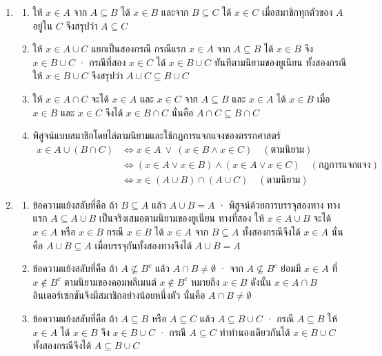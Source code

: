 \begin{enumerate}[resume*=anskey]
    \item
    \begin{enumerate}[label=\textbf{\thechapter.\arabic{enumi}.\arabic*}]
        \item ให้ $x \in A$ จาก $A \subseteq B$ ได้ $x \in B$ และจาก $B \subseteq C$ ได้ $x \in C$ เมื่อสมาชิกทุกตัวของ $A$ อยู่ใน $C$ จึงสรุปว่า $A \subseteq C$
        \item ให้ $x \in A \cup C$ แยกเป็นสองกรณี กรณีแรก $x \in A$ จาก $A \subseteq B$ ได้ $x \in B$ จึง $x \in B \cup C$ · กรณีที่สอง $x \in C$ ได้ $x \in B \cup C$ ทันทีตามนิยามของยูเนียน ทั้งสองกรณีให้ $x \in B \cup C$ จึงสรุปว่า $A \cup C \subseteq B \cup C$
        \item ให้ $x \in A \cap C$ จะได้ $x \in A$ และ $x \in C$ จาก $A \subseteq B$ และ $x \in A$ ได้ $x \in B$ เมื่อ $x \in B$ และ $x \in C$ จึงได้ $x \in B \cap C$ นั่นคือ $A \cap C \subseteq B \cap C$
        \item พิสูจน์แบบสมาชิกโดยไล่ตามนิยามและใช้กฎการแจกแจงของตรรกศาสตร์
        \begin{align*}
        x \in A \cup (B \cap C)
        &\Leftrightarrow x \in A \ \lor\ (x \in B \land x \in C) \quad (\text{ตามนิยาม})\\
        &\Leftrightarrow (x \in A \lor x \in B) \land (x \in A \lor x \in C) \quad (\text{กฎการแจกแจง})\\
        &\Leftrightarrow x \in (A \cup B) \cap (A \cup C) \quad (\text{ตามนิยาม})
        \end{align*}
    \end{enumerate}

    \item
    \begin{enumerate}[label=\textbf{\thechapter.\arabic{enumi}.\arabic*}]
        \item ข้อความแย้งสลับที่คือ ถ้า $B \subseteq A$ แล้ว $A \cup B = A$ · พิสูจน์ด้วยการบรรจุสองทาง ทางแรก $A \subseteq A \cup B$ เป็นจริงเสมอตามนิยามของยูเนียน ทางที่สอง ให้ $x \in A \cup B$ จะได้ $x \in A$ หรือ $x \in B$ กรณี $x \in B$ ได้ $x \in A$ จาก $B \subseteq A$ ทั้งสองกรณีจึงได้ $x \in A$ นั่นคือ $A \cup B \subseteq A$ เมื่อบรรจุกันทั้งสองทางจึงได้ $A \cup B = A$
        \item ข้อความแย้งสลับที่คือ ถ้า $A \not\subseteq B^c$ แล้ว $A \cap B \neq \emptyset$ · จาก $A \not\subseteq B^c$ ย่อมมี $x \in A$ ที่ $x \notin B^c$ ตามนิยามของคอมพลีเมนต์ $x \notin B^c$ หมายถึง $x \in B$ ดังนั้น $x \in A \cap B$ อินเตอร์เซกชันจึงมีสมาชิกอย่างน้อยหนึ่งตัว นั่นคือ $A \cap B \neq \emptyset$
        \item ข้อความแย้งสลับที่คือ ถ้า $A \subseteq B$ หรือ $A \subseteq C$ แล้ว $A \subseteq B \cup C$ · กรณี $A \subseteq B$ ให้ $x \in A$ ได้ $x \in B$ จึง $x \in B \cup C$ · กรณี $A \subseteq C$ ทำทำนองเดียวกันได้ $x \in B \cup C$ ทั้งสองกรณีจึงได้ $A \subseteq B \cup C$
    \end{enumerate}


\end{enumerate}
